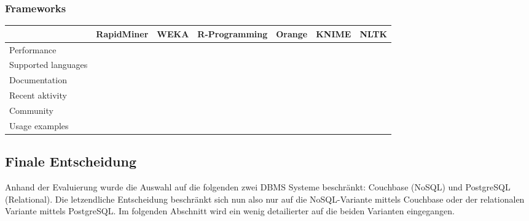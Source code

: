 		\subsubsection{Frameworks}

		\begin{tabular} {| l | c | c | c | c | c | c |}
			\hline
			& RapidMiner & WEKA &  R-Programming & Orange & KNIME & NLTK		\\ \hline \hline
			Performance &  &  &  &  &  &  &		\\ \hline
			Supported languages &  &	 &  &  &  &  &	 			\\ \hline
			Documentation &  &	 &  &  &  &  &	 		\\ \hline
			Recent aktivity &  &	 &  &  &  &  &			\\ \hline
			Community &  &  &  &  &  &  &		\\ \hline 
			Usage examples	&  &	&  &  &  &  &					\\ \hline
		\end{tabular}

	\newpage
	\subsection{Finale Entscheidung}
	Anhand der Evaluierung wurde die Auswahl auf die folgenden zwei DBMS Systeme beschränkt: Couchbase (NoSQL) und PostgreSQL (Relational). Die letzendliche Entscheidung beschränkt sich nun also nur auf die NoSQL-Variante mittels Couchbase oder der relationalen Variante mittels PostgreSQL. Im folgenden Abschnitt wird ein wenig detailierter auf die beiden Varianten eingegangen.

